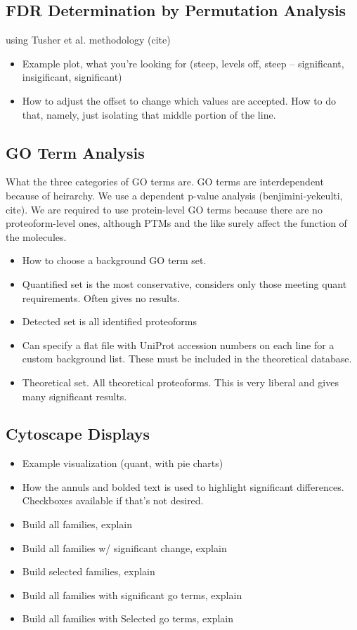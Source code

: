 \subsection{FDR Determination by Permutation Analysis}
using Tusher et al. methodology (cite)
\begin{itemize}
	\item Example plot, what you're looking for (steep, levels off, steep -- significant, insigificant, significant)
	\item How to adjust the offset to change which values are accepted. How to do that, namely, just isolating that middle portion of the line.
\end{itemize}

\subsection{GO Term Analysis}
What the three categories of GO terms are. GO terms are interdependent because of heirarchy. We use a dependent p-value analysis (benjimini-yekeulti, cite). We are required to use protein-level GO terms because there are no proteoform-level ones, although PTMs and the like surely affect the function of the molecules.
\begin{itemize}
	\item How to choose a background GO term set.
	\item Quantified set is the most conservative, considers only those meeting quant requirements. Often gives no results.
	\item Detected set is all identified proteoforms
	\item Can specify a flat file with UniProt accession numbers on each line for a custom background list. These must be included in the theoretical database.
	\item Theoretical set. All theoretical proteoforms. This is very liberal and gives many significant results.
\end{itemize}

\subsection{Cytoscape Displays}
\begin{itemize}
	\item Example visualization (quant, with pie charts)
	\item How the annuls and bolded text is used to highlight significant differences. Checkboxes available if that's not desired.
	\item Build all families, explain
	\item Build all families w/ significant change, explain
	\item Build selected families, explain
	\item Build all families with significant go terms, explain
	\item Build all families with Selected go terms, explain
\end{itemize}
